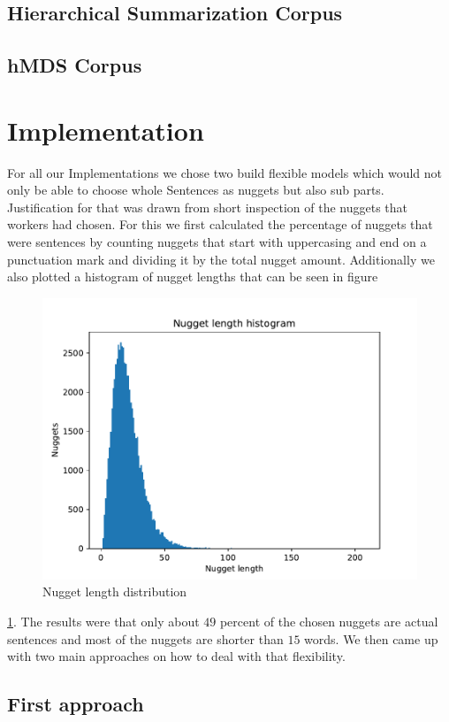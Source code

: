 \documentclass{article}
\begin{document}
\subsection{Hierarchical Summarization Corpus}



\subsection{hMDS Corpus}



\section{Implementation}
\label{headings}


For all our Implementations we chose two build flexible models which would not only be able to choose whole Sentences as nuggets but also sub parts. Justification for that was drawn from short inspection of the nuggets that workers had chosen. For this we first calculated the percentage of nuggets that were sentences by counting nuggets that start with uppercasing and end on a punctuation mark and dividing it by the total nugget amount. Additionally we also plotted a histogram of nugget lengths that can be seen in figure
\begin{figure}[!ht]
	\centering
	\includegraphics[width=0.55\linewidth]{Nugget_size.pdf}
	\caption{Nugget length distribution}
	\label{fig:nuggets}
\end{figure}
\ref{fig:nuggets}.
The results were that only about $49$ percent of the chosen nuggets are actual sentences and most of the nuggets are shorter than $15$ words. We then came up with two main approaches on how to deal with that flexibility.

\subsection{First approach}
\end{document}

